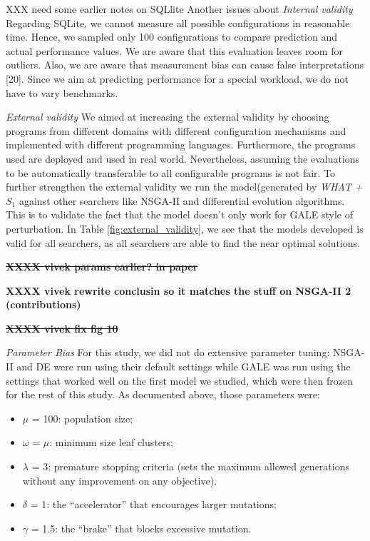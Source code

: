 \documentclass{sig-alternative}
\begin{document}
XXX need some earlier notes on SQLlite \newline Another issues about {\em Internal validity}
Regarding SQLite, we cannot measure all possible configurations in reasonable time. Hence, we sampled only 100 configurations to compare prediction and actual performance values. We are aware that this evaluation leaves room for outliers.
Also, we are aware that measurement bias can cause false interpretations [20]. Since we aim at predicting performance for a special workload, we do not have to vary benchmarks.



{\em External validity}  We aimed at increasing the external validity by choosing programs from different domains with different configuration mechanisms and implemented with different programming languages. Furthermore, the programs used are deployed and used in real world. Nevertheless, assuming the evaluations to be automatically transferable  to all configurable programs is not fair. To further strengthen the external validity we run the model(generated by \textit{WHAT + $S_1$} against other searchers like NSGA-II and differential evolution algorithms\cite{storn1997differential}. This is to validate the fact that the model doesn't only work for GALE style of perturbation. In Table \ref{fig:external_validity}, we see that the models developed is valid for all searchers, as all searchers are able to find the near optimal solutions.


\st{\bf XXXX vivek params earlier? in paper  }


{\bf XXXX vivek rewrite conclusin so it matches the stuff on NSGA-II 2 (contributions) }


\st{\bf XXXX vivek fix fig 10 }

{\em Parameter Bias} 
For this study, we did not do extensive parameter tuning:
NSGA-II and DE were run using their default
settings while GALE was run using the settings that
worked well on the first model we studied, which were
then frozen for the rest of this study. As documented
above, those parameters were:
\begin{itemize}
\item $\mu$ = 100: population size;
\item $\omega$ = $\mu$: minimum size leaf clusters;
\item $\lambda$ = 3: premature stopping criteria (sets the maximum
allowed generations without any improvement
on any objective).
\item $\delta$ = 1: the ``accelerator'' that encourages larger
mutations;
\item $\gamma$ = 1.5: the ``brake'' that blocks excessive mutation.
\end{itemize}
\end{document}

